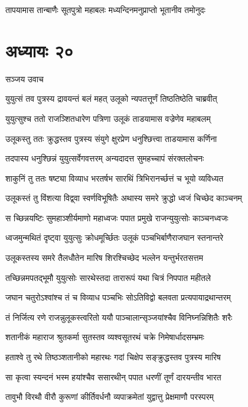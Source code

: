 \twolineshloka
{तापयामास तान्बाणैः सूतपुत्रो महाबलः}
{मध्यन्दिनमनुप्राप्तो भूतानीव तमोनुदः}


\chapter{अध्यायः २०}
\twolineshloka
{सञ्जय उवाच}
{}


\twolineshloka
{युयुत्सं तव पुत्रस्य द्रावयन्तं बलं महत्}
{उलूको न्यपतत्तूर्णं तिष्ठतिष्ठेति चाब्रवीत्}


\twolineshloka
{युयुत्सुश्च ततो राजञ्शितधारेण पत्रिणा}
{उलूकं ताडयामास वज्रेणेव महाबलम्}


\twolineshloka
{उलूकस्तु ततः क्रुद्धस्तव पुत्रस्य संयुगे}
{क्षुरप्रेण धनुश्छित्त्वा ताडयामास कर्णिना}


\twolineshloka
{तदपास्य धनुश्छिन्नं युयुत्सर्वेगवत्तरम्}
{अन्यदादत्त सुमहच्चापं संरक्तलोचनः}


\twolineshloka
{शाकुनिं तु ततः षष्ट्या विव्याध भरतर्षभ}
{सारथिं त्रिभिरानर्च्छत्तं च भूयो व्यविध्यत}


\twolineshloka
{उलूकस्तं तु विंशत्या विद्व्वा स्वर्णविभूषितैः}
{अथास्य समरे क्रुद्धो ध्वजं चिच्छेद काञ्चनम्}


\twolineshloka
{स च्छिन्नयष्टिः सुमहाञ्शीर्यमाणो महाध्वजः}
{पपात प्रमुखे राजन्युयुत्सोः काञ्चनध्वजः}


\twolineshloka
{ध्वजमुन्मथितं दृष्ट्वा युयुत्सुः क्रोधमूर्च्छितः}
{उलूकं पञ्चभिर्बाणैराजघान स्तनान्तरे}


\twolineshloka
{उलूकस्तस्य समरे तैलधौतेन मारिष}
{शिरश्चिच्छेद भल्लेन यन्तुर्भरतसत्तम}


\twolineshloka
{तच्छिन्नमपतद्भूमौ युयुत्सोः सारथेस्तदा}
{तारारूपं यथा चित्रं निपपात महीतले}


\twolineshloka
{जघान चतुरोऽश्वांश्च तं च विव्याध पञ्चभिः}
{सोऽतिविद्वो बलवता प्रत्यपायाद्रथान्तरम्}


\twolineshloka
{तं निर्जित्य रणे राजन्नुलूकस्त्वरितो ययौ}
{पाञ्चालान्सृञ्जयांश्चैव विनिघ्नन्निशितैः शरैः}


\twolineshloka
{शतानीकं महाराज श्रुतकर्मा सुतस्तव}
{व्यश्वसूतरथं चक्रे निमेषार्धादसम्भ्रमः}


\twolineshloka
{हताश्वे तु रथे तिष्ठञ्शतानीको महारथः}
{गदां चिक्षेप सङ्क्रुद्धस्तव पुत्रस्य मारिष}


\twolineshloka
{सा कृत्वा स्यन्दनं भस्म हयांश्चैव ससारथीन्}
{पपात धरणीं तूर्णं दारयन्तीव भारत}


\twolineshloka
{तावुभौ विरथौ वीरौ कुरूणां कीर्तिवर्धनौ}
{व्यपाक्रमेतां युद्वात्तु प्रेक्षमाणौ परस्परम्}


